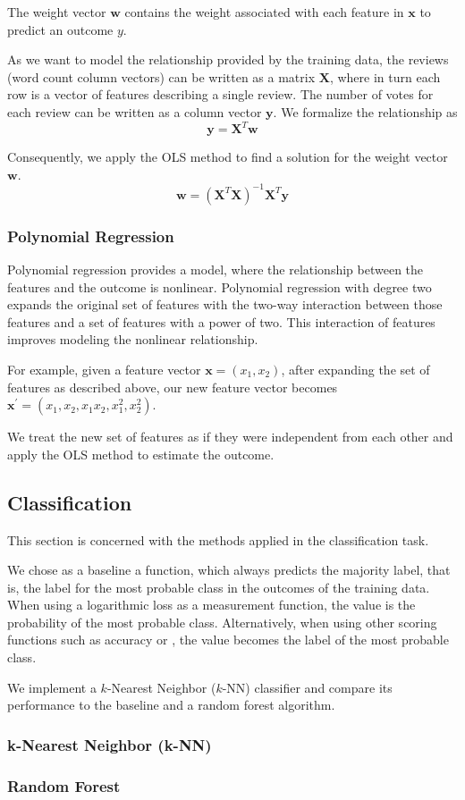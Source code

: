 The weight vector $\mathbf{w}$ contains the weight associated with each feature
in $\mathbf{x}$ to predict an outcome $y$.

As we want to model the relationship provided by the training data, the reviews
(word count column vectors) can be written as a matrix $\mathbf{X}$, where in
turn each row is a vector of features describing a single review.  The number of
votes for each review can be written as a column vector $\mathbf{y}$.  We
formalize the relationship as
\[
  \mathbf{y} = \mathbf{X}^T \mathbf{w}
\]

Consequently, we apply the OLS method to find a solution for the weight vector
$\mathbf{w}$.
\[
  \mathbf{w} = {(\mathbf{X}^T \mathbf{X})}^{-1} \mathbf{X}^T \mathbf{y}
\]

\subsubsection{Polynomial Regression}

Polynomial regression provides a model, where the relationship between the
features and the outcome is nonlinear.  Polynomial regression with degree two
expands the original set of features with the two-way interaction between those
features and a set of features with a power of two.  This interaction of
features improves modeling the nonlinear relationship.

For example, given a feature vector $\mathbf{x} = (x_1, x_2)$, after expanding
the set of features as described above, our new feature vector becomes
$\mathbf{x}^{'} = (x_1, x_2, x_1x_2, x_1^2, x_2^2)$.

We treat the new set of features as if they were independent from each other
and apply the OLS method to estimate the outcome.

\subsection{Classification}

This section is concerned with the methods applied in the classification task.

We chose as a baseline a function, which always predicts the majority label,
that is, the label for the most probable class in the outcomes of the training
data.  When using a logarithmic loss as a measurement function, the value is the
probability of the most probable class.  Alternatively, when using other scoring
functions such as accuracy or \fmeasure, the value becomes the label of the most
probable class.

We implement a $k$-Nearest Neighbor ($k$-NN) classifier and compare its
performance to the baseline and a random forest algorithm.

\subsubsection{k-Nearest Neighbor (k-NN)}

\subsubsection{Random Forest}

